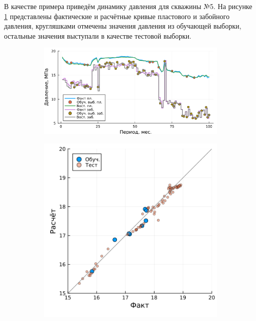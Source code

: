 \documentclass[14pt]{article}
\begin{document}
В качестве примера приведём динамику давления для скважины №5. На рисунке \ref{fig:m9_din_w5a} представлены фактические и расчётные кривые пластового и забойного давления, кругляшками отмечены значения давления из обучающей выборки, остальные значения выступали в качестве тестовой выборки.
\begin{figure}[!htb]
	\centering
	\begin{subfigure}[b]{0.9\linewidth}
		\includegraphics[width=\linewidth]{pic/simW5}
		\caption{}
		\label{fig:m9_din_w5a}
	\end{subfigure}
	\begin{subfigure}[b]{0.45\linewidth}
		\includegraphics[width=\linewidth]{pic/cppplW5}
		\caption{}
		\label{fig:m9_din_w5b}

\end{subfigure}
\end{figure}
\end{document}
